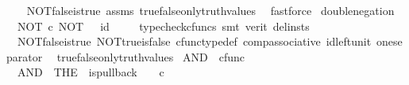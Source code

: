 \begin{isabellebody}
%
\isadelimproof
\ \ %
\endisadelimproof
%
\isatagproof
{}\isamarkupfalse%
\ NOT{\isacharunderscore}{\kern0pt}false{\isacharunderscore}{\kern0pt}is{\isacharunderscore}{\kern0pt}true\ assms\ true{\isacharunderscore}{\kern0pt}false{\isacharunderscore}{\kern0pt}only{\isacharunderscore}{\kern0pt}truth{\isacharunderscore}{\kern0pt}values\ \isamarkupfalse%
\ fastforce%
\endisatagproof
{\isafoldproof}%
%
\isadelimproof
\isanewline
%
\endisadelimproof
\isanewline
{}\isamarkupfalse%
\ double{\isacharunderscore}{\kern0pt}negation{\isacharcolon}{\kern0pt}\isanewline
\ \ {\isachardoublequoteopen}NOT\ {\isasymcirc}\isactrlsub c\ NOT\ {\isacharequal}{\kern0pt}\ \ id\ {\isasymOmega}{\isachardoublequoteclose}\isanewline
%
\isadelimproof
\ \ %
\endisadelimproof
%
\isatagproof
{}\isamarkupfalse%
\ {\isacharparenleft}{\kern0pt}typecheck{\isacharunderscore}{\kern0pt}cfuncs{\isacharcomma}{\kern0pt}\ smt\ {\isacharparenleft}{\kern0pt}verit{\isacharcomma}{\kern0pt}\ del{\isacharunderscore}{\kern0pt}insts{\isacharparenright}{\kern0pt}\ \isanewline
\ \ NOT{\isacharunderscore}{\kern0pt}false{\isacharunderscore}{\kern0pt}is{\isacharunderscore}{\kern0pt}true\ NOT{\isacharunderscore}{\kern0pt}true{\isacharunderscore}{\kern0pt}is{\isacharunderscore}{\kern0pt}false\ cfunc{\isacharunderscore}{\kern0pt}type{\isacharunderscore}{\kern0pt}def\ comp{\isacharunderscore}{\kern0pt}associative\ id{\isacharunderscore}{\kern0pt}left{\isacharunderscore}{\kern0pt}unit{}\ one{\isacharunderscore}{\kern0pt}separator\isanewline
\ \ true{\isacharunderscore}{\kern0pt}false{\isacharunderscore}{\kern0pt}only{\isacharunderscore}{\kern0pt}truth{\isacharunderscore}{\kern0pt}values{\isacharparenright}{\kern0pt}%
\endisatagproof
{\isafoldproof}%
%
\isadelimproof
%
\endisadelimproof
%
\isadelimdocument
%
\endisadelimdocument
%
\isatagdocument
%
\isamarkuptrue%
%
\endisatagdocument
{\isafolddocument}%
%
\isadelimdocument
%
\endisadelimdocument
{}\isamarkupfalse%
\ AND\ {\isacharcolon}{\kern0pt}{\isacharcolon}{\kern0pt}\ {\isachardoublequoteopen}cfunc{\isachardoublequoteclose}\ \isanewline
\ \ {\isachardoublequoteopen}AND\ {\isacharequal}{\kern0pt}\ {\isacharparenleft}{\kern0pt}THE\ {\isasymchi}{\isachardot}{\kern0pt}\ is{\isacharunderscore}{\kern0pt}pullback\ {\isasymone}\ {\isasymone}\ {\isacharparenleft}{\kern0pt}{\isasymOmega}\ {\isasymtimes}\isactrlsub c\ {\isasymOmega}{\isacharparenright}{\kern0pt}\ {\isasymOmega}\ {\isacharparenleft}{\kern0pt}{\isasymbeta}\isactrlbsub {\isasymone}\isactrlesub {\isacharparenright}{\kern0pt}\ {\isasymt}\ {\isasymlangle}{\isasymt}{\isacharcomma}{\kern0pt}{\isasymt}{\isasymrangle}\ {\isasymchi}{\isacharparenright}{\kern0pt}{\isachardoublequoteclose}\isanewline

\end{isabellebody}
